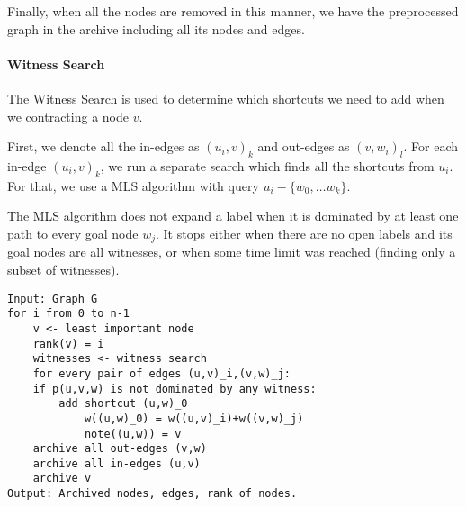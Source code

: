 
Finally, when all the nodes are removed in this manner, we have the preprocessed graph in the archive including all its nodes and edges.

\paragraph*{Witness Search}
The Witness Search is used to determine which shortcuts we need to add when we contracting a node $v$. 

First, we denote all the in-edges as $(u_i,v)_k$ and out-edges as $(v,w_i)_l$. For each in-edge $(u_i,v)_k$, we run a separate search which finds all the shortcuts from $u_i$. For that, we use a MLS algorithm with query $u_i-\{w_0,\dots w_k\}$. 

The MLS algorithm does not expand a label when it is dominated by at least one path to every goal node $w_j$. It stops either when there are no open labels and its goal nodes are all witnesses,
or when some time limit was reached (finding only a subset of witnesses). 

\renewcommand{\lstlistingname}{Pseudocode}
\begin{lstlisting}[caption={MCHp},label=MCHp,captionpos=t,float,abovecaptionskip=-\medskipamount]
Input: Graph G
for i from 0 to n-1
    v <- least important node
    rank(v) = i
    witnesses <- witness search
    for every pair of edges (u,v)_i,(v,w)_j:
    if p(u,v,w) is not dominated by any witness:
        add shortcut (u,w)_0
            w((u,w)_0) = w((u,v)_i)+w((v,w)_j)
            note((u,w)) = v
    archive all out-edges (v,w) 
    archive all in-edges (u,v)
    archive v
Output: Archived nodes, edges, rank of nodes.
\end{lstlisting}
